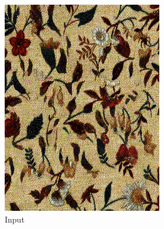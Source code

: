 \begin{figure}[]
    \begin{subfigure}{\textwidth}
        \centering
        \begin{subfigure}{0.24\textwidth}
            \centering
            \includegraphics[width=\textwidth]{images/04-experiment02/human/flowers2/target.jpg}
            \caption*{Input}
        \end{subfigure}
        \hfill
        \begin{subfigure}{0.24\textwidth}
            \centering

\end{subfigure}
\end{subfigure}
\end{figure}
